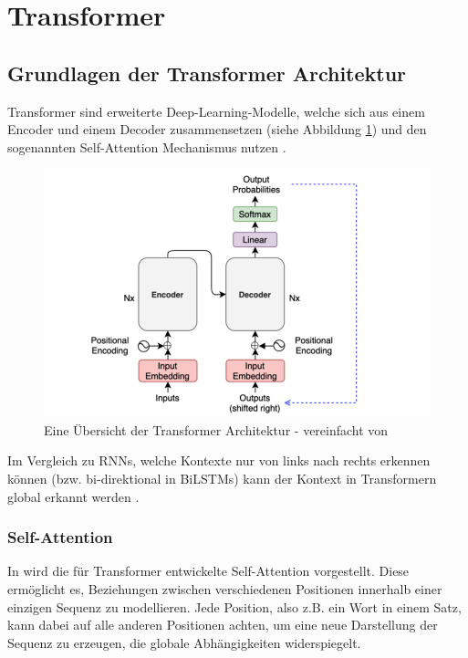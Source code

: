 \section{Transformer}
\label{sec:transformer}

\subsection{Grundlagen der Transformer Architektur}

Transformer sind erweiterte Deep-Learning-Modelle, welche sich aus einem Encoder und einem Decoder zusammensetzen (siehe Abbildung 
\ref{fig:transformeroverview}) und den sogenannten Self-Attention Mechanismus nutzen \cite{vaswani2023attentionneed}.

\begin{figure}[htbp]
    \begin{center}
    \includegraphics[scale=0.4]{static/transformer-overview.png}
    \caption{\label{fig:transformeroverview} Eine Übersicht der Transformer Architektur \cite{kikaben2021transformer} 
    - vereinfacht von \cite{vaswani2023attentionneed}}
    \end{center}
\end{figure}

Im Vergleich zu RNNs, welche Kontexte nur von links nach rechts erkennen können (bzw. bi-direktional in BiLSTMs) kann der Kontext in Transformern
global erkannt werden \cite{ghojogh2020}.

\subsubsection{Self-Attention} \label{sec:self_attention}

In \cite{vaswani2023attentionneed} wird die für Transformer entwickelte Self-Attention vorgestellt.
Diese ermöglicht es, Beziehungen zwischen verschiedenen Positionen innerhalb einer einzigen Sequenz zu modellieren. 
Jede Position, also z.B. ein Wort in einem Satz, kann dabei auf alle anderen Positionen achten, um eine neue Darstellung der Sequenz zu erzeugen, 
die globale Abhängigkeiten widerspiegelt.

